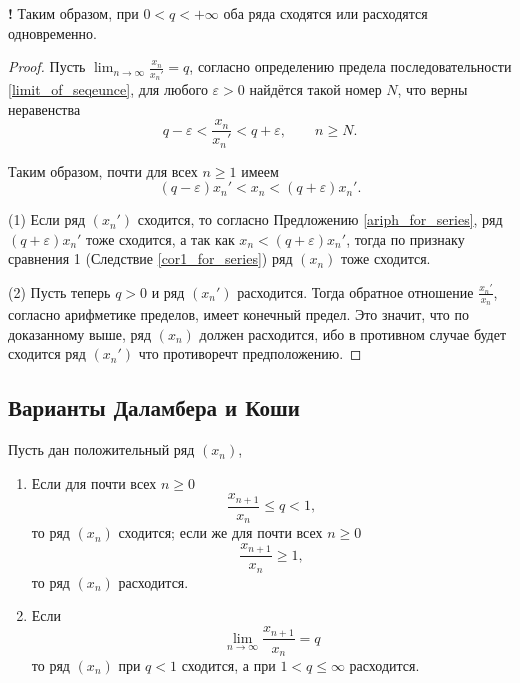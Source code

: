 \begin{mydangerr}{\bf !}
    Таким образом, при $0<q < +\infty$ оба ряда сходятся или расходятся одновременно.
\end{mydangerr}

\begin{proof}
Пусть $\lim_{n \to \infty} \frac{x_n}{x_n'} = q$, согласно определению предела последовательности \ref{limit_of_seqeunce}, для любого $\varepsilon >0$ найдётся такой номер $N$, что верны неравенства
    \[
     q-\varepsilon < \frac{x_n}{x_n'} < q+ \varepsilon, \qquad n \ge N.
    \]

Таким образом, почти для всех $n\ge 1$ имеем
\[
(q-\varepsilon)x_n' < x_n < (q+\varepsilon)x_n'.
\]

(1) Если ряд $(x_n')$ сходится, то согласно Предложению \ref{ariph_for_series}, ряд $(q+\varepsilon)x_n'$ тоже сходится, а так как 
$x_n < (q+\varepsilon)x_n'$, тогда по признаку сравнения 1 (Следствие \ref{cor1_for_series}) ряд $(x_n)$ тоже сходится.

(2) Пусть теперь $q>0$ и ряд $(x_n')$ расходится. Тогда обратное отношение $\frac{x_n'}{x_n}$, согласно арифметике пределов, имеет конечный предел. Это значит, что по доказанному выше, ряд $(x_n)$ должен расходится, ибо в противном случае будет сходится ряд $(x_n')$ что противоречт предположению.


\end{proof}

\subsection{Варианты Даламбера и Коши}


\begin{corollary}\label{Dalamber_criteria_for_series}
    Пусть дан положительный ряд $(x_n)$, 
    \begin{enumerate}
        \item Если для почти всех $n \ge 0$
        \[
         \frac{x_{n+1}}{x_n} \le q <1,
        \]
        то ряд $(x_n)$ сходится; если же для почти всех $n \ge 0$
        \[
         \frac{x_{n+1}}{x_n} \ge 1,
        \]
        то ряд $(x_n)$ расходится.

        \item Если 
        \[
         \lim_{n \to \infty} \frac{x_{n+1}}{x_n} = q
        \]
        то ряд $(x_n)$ при $q<1$ сходится, а при $1 < q \le \infty$ расходится.
    \end{enumerate}
\end{corollary}


